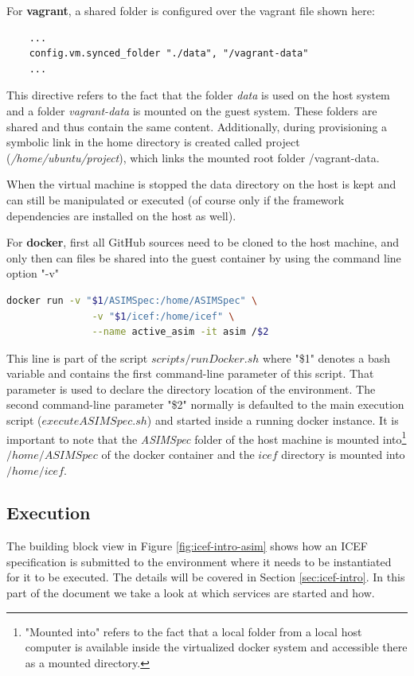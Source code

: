 For \textbf{vagrant}, a shared folder is configured over the vagrant file shown here:
\begin{lstlisting}
	...
	config.vm.synced_folder "./data", "/vagrant-data"
	...
\end{lstlisting}
This directive refers to the fact that the folder \textit{data} is used on the host system and a folder \textit{vagrant-data} is mounted on the guest system. These folders are shared and thus contain the same content. Additionally, during provisioning a symbolic link in the home directory is created called project (\textit{/home/ubuntu/project}), which links the mounted root folder /vagrant-data.

When the virtual machine is stopped the data directory on the host is kept and can still be manipulated or executed (of course only if the framework dependencies are installed on the host as well).

For \textbf{docker}, first all GitHub sources need to be cloned to the host machine, and only then can files be shared into the guest container by using the command line option "-v"
\begin{lstlisting}[language=bash]
	docker run -v "$1/ASIMSpec:/home/ASIMSpec" \
	           -v "$1/icef:/home/icef" \
	           --name active_asim -it asim /$2
\end{lstlisting}

This line is part of the script $scripts/runDocker.sh$ where "\$1" denotes a bash variable and contains the first command-line parameter of this script. That parameter is used to declare the directory location of the environment. The second command-line parameter "\$2" normally is defaulted to the main execution script ($executeASIMSpec.sh$) and started inside a running docker instance. It is important to note that the \textit{ASIMSpec} folder of the host machine is mounted into\footnote{"Mounted into" refers to the fact that a local folder from a local host computer is available inside the virtualized docker system and accessible there as a mounted directory.} $/home/ASIMSpec$ of the docker container and the $icef$ directory is mounted into $/home/icef$.

\subsection{Execution}
\label{sec:env-exec-stack-exe}

The building block view in Figure \ref{fig:icef-intro-asim} shows how an ICEF specification is submitted to the environment where it needs to be instantiated for it to be executed. The details will be covered in Section \ref{sec:icef-intro}. In this part of the document we take a look at which services are started and how.

